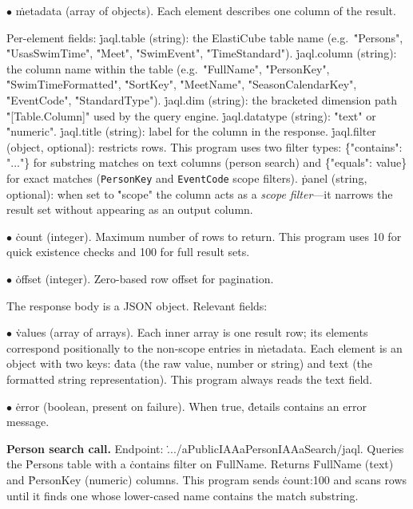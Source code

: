 \item{$\bullet$} \.{metadata} (array of objects).
Each element describes one column of the result.
\par\noindent Per-element fields:
\itemitem{--} \.{jaql.table} (string): the ElastiCube table name
(e.g.\ \.{"Persons"}, \.{"UsasSwimTime"}, \.{"Meet"},
\.{"SwimEvent"}, \.{"TimeStandard"}).
\itemitem{--} \.{jaql.column} (string): the column name within the table
(e.g.\ \.{"FullName"}, \.{"PersonKey"}, \.{"SwimTimeFormatted"},
\.{"SortKey"}, \.{"MeetName"}, \.{"SeasonCalendarKey"},
\.{"EventCode"}, \.{"StandardType"}).
\itemitem{--} \.{jaql.dim} (string): the bracketed dimension path
\.{"[Table.Column]"} used by the query engine.
\itemitem{--} \.{jaql.datatype} (string): \.{"text"} or \.{"numeric"}.
\itemitem{--} \.{jaql.title} (string): label for the column in the response.
\itemitem{--} \.{jaql.filter} (object, optional): restricts rows.
This program uses two filter types:
\.{\{"contains": "..."\}} for substring matches on text columns
(person search) and \.{\{"equals": value\}} for exact matches
({\tt PersonKey} and {\tt EventCode} scope filters).
\itemitem{--} \.{panel} (string, optional): when set to \.{"scope"}
the column acts as a {\it scope filter}---it narrows the result set
without appearing as an output column.

\item{$\bullet$} \.{count} (integer).
Maximum number of rows to return.
This program uses 10 for quick existence checks and 100 for full
result sets.

\item{$\bullet$} \.{offset} (integer).
Zero-based row offset for pagination.

\medskip\noindent
The response body is a JSON object.  Relevant fields:

\medskip
\item{$\bullet$} \.{values} (array of arrays).
Each inner array is one result row; its elements correspond
positionally to the non-scope entries in \.{metadata}.
Each element is an object with two keys: \.{data} (the raw value,
number or string) and \.{text} (the formatted string representation).
This program always reads the \.{text} field.

\item{$\bullet$} \.{error} (boolean, present on failure).
When true, \.{details} contains an error message.

\medskip\noindent
{\bf Person search call.}
Endpoint: \.{.../aPublicIAAaPersonIAAaSearch/jaql}.
Queries the \.{Persons} table with a \.{contains} filter on
\.{FullName}.  Returns \.{FullName} (text) and \.{PersonKey} (numeric)
columns.  This program sends \.{count:100} and scans rows until it
finds one whose lower-cased name contains the match substring.

